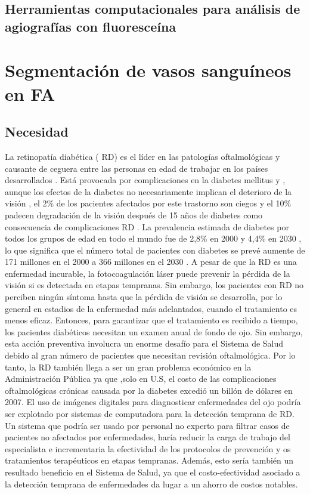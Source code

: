 	\subsection{Herramientas computacionales para an\'alisis de agiograf\'ias con fluoresce\'ina}



\section{Segmentaci\'on de vasos sangu\'ineos en FA}

	\subsection{Necesidad}
	La retinopatía diabética ( RD) es el líder en las patologías oftalmológicas y causante de ceguera entre las personas en edad de trabajar en los países desarrollados . Está provocada por complicaciones en la diabetes mellitus y , aunque los efectos de la diabetes no necesariamente implican el deterioro de la visión , el 2\% de los pacientes afectados por este trastorno son ciegos y el 10\% padecen  degradación de la visión después de 15 años de diabetes como consecuencia de complicaciones RD . La prevalencia estimada de diabetes por todos los grupos de edad en todo el mundo fue de 2,8\% en 2000 y 4,4\% en 2030 , lo que significa que el número total de pacientes con diabetes se prevé aumente de 171 millones en el  2000 a 366 millones en el 2030 .
	A pesar de que la RD es una enfermedad incurable, la fotocoagulación láser puede prevenir la pérdida de la visión si es detectada en etapas tempranas. Sin embargo, los pacientes con RD no perciben ningún síntoma hasta que la pérdida de visión se desarrolla, por lo general en estadios de la enfermedad más adelantados, cuando el tratamiento es menos eficaz. Entonces, para garantizar que el tratamiento es recibido a tiempo, los pacientes diabéticos necesitan un examen anual de fondo de ojo. Sin embargo, esta acción preventiva involucra un enorme desafío para el Sistema de Salud debido  al gran número de pacientes que necesitan revisión oftalmológica. Por lo tanto, la RD también llega a ser un gran problema económico en la  Administración Pública ya que ,solo en U.S, el costo de las complicaciones oftalmológicas crónicas causada por la diabetes excedió un billón de dólares en 2007.
El uso de imágenes digitales para diagnosticar enfermedades del ojo podría ser explotado por sistemas de computadora para la detección temprana de RD. Un sistema que podría ser  usado por personal no experto para filtrar casos de pacientes no afectados por enfermedades, haría reducir la carga de trabajo del especialista e incrementaria la efectividad de los protocolos de prevención y os tratamientos terapéuticos en etapas tempranas. Además, esto sería también un resultado beneficio en el Sistema de Salud, ya que el costo-efectividad asociado a la detección temprana de enfermedades da lugar a un ahorro de costos notables.
